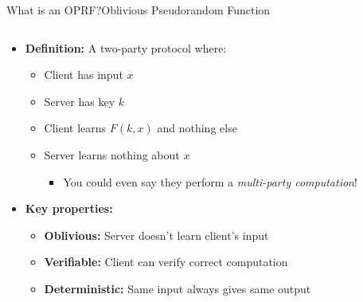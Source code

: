 \documentclass[aspectratio=169, lualatex, handout]{beamer}
\begin{document}
\begin{frame}{What is an OPRF?}{Oblivious Pseudorandom Function}
	\begin{columns}[c]
		\begin{column}{1\textwidth}
			\begin{itemize}
				\item \textbf{Definition:} A two-party protocol where:
				      \begin{itemize}
					      \item Client has input $x$
					      \item Server has key $k$
					      \item Client learns $F(k, x)$ and nothing else
					      \item Server learns nothing about $x$
					            \begin{itemize}
						            \item You could even say they perform a \textit{multi-party computation}!
					            \end{itemize}
				      \end{itemize}
				\item \textbf{Key properties:}
				      \begin{itemize}
					      \item \textbf{Oblivious:} Server doesn't learn client's input
					      \item \textbf{Verifiable:} Client can verify correct computation
					      \item \textbf{Deterministic:} Same input always gives same output
				      \end{itemize}
			\end{itemize}
		\end{column}
	\end{columns}
\end{frame}
\end{document}
